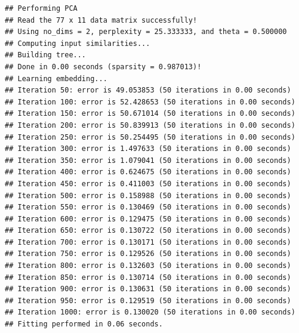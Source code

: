 \documentclass[
]{article}
\begin{document}
\begin{verbatim}
## Performing PCA
## Read the 77 x 11 data matrix successfully!
## Using no_dims = 2, perplexity = 25.333333, and theta = 0.500000
## Computing input similarities...
## Building tree...
## Done in 0.00 seconds (sparsity = 0.987013)!
## Learning embedding...
## Iteration 50: error is 49.053853 (50 iterations in 0.00 seconds)
## Iteration 100: error is 52.428653 (50 iterations in 0.00 seconds)
## Iteration 150: error is 50.671014 (50 iterations in 0.00 seconds)
## Iteration 200: error is 50.839913 (50 iterations in 0.00 seconds)
## Iteration 250: error is 50.254495 (50 iterations in 0.00 seconds)
## Iteration 300: error is 1.497633 (50 iterations in 0.00 seconds)
## Iteration 350: error is 1.079041 (50 iterations in 0.00 seconds)
## Iteration 400: error is 0.624675 (50 iterations in 0.00 seconds)
## Iteration 450: error is 0.411003 (50 iterations in 0.00 seconds)
## Iteration 500: error is 0.158988 (50 iterations in 0.00 seconds)
## Iteration 550: error is 0.130469 (50 iterations in 0.00 seconds)
## Iteration 600: error is 0.129475 (50 iterations in 0.00 seconds)
## Iteration 650: error is 0.130722 (50 iterations in 0.00 seconds)
## Iteration 700: error is 0.130171 (50 iterations in 0.00 seconds)
## Iteration 750: error is 0.129526 (50 iterations in 0.00 seconds)
## Iteration 800: error is 0.132603 (50 iterations in 0.00 seconds)
## Iteration 850: error is 0.130714 (50 iterations in 0.00 seconds)
## Iteration 900: error is 0.130631 (50 iterations in 0.00 seconds)
## Iteration 950: error is 0.129519 (50 iterations in 0.00 seconds)
## Iteration 1000: error is 0.130020 (50 iterations in 0.00 seconds)
## Fitting performed in 0.06 seconds.
\end{verbatim}
\end{document}
